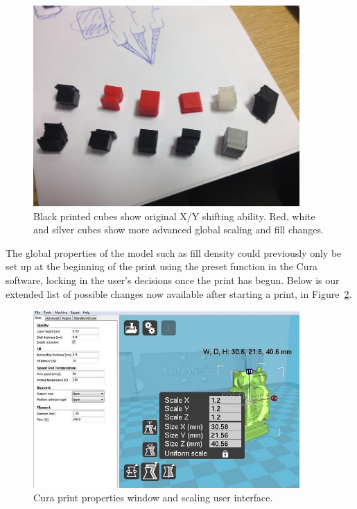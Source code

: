 \documentclass[pdftex, 11pt]{report} %
\begin{document}
\begin{figure}[H]
  \centering
  \includegraphics[width=4in]{RedWhiteSilver.png}
  \caption{Black printed cubes show original X/Y shifting ability. Red, white and silver cubes show more advanced global scaling and fill changes.}
  \label{figure:RedWhiteSilver}
\end{figure}

The global properties of the model such as fill density could previously only be set up at the beginning of the print using the preset function in the Cura software, locking in the user's decisions once the print has begun. Below is our extended list of possible changes now available after starting a print, in Figure~\ref{figure:CuraScalingRobot}.

\begin{figure}[H]
  \centering
  \includegraphics[width=4in]{CuraScalingRobot.png}
  \caption{Cura print properties window and scaling user interface.}
  \label{figure:CuraScalingRobot}
\end{figure}
\end{document}
